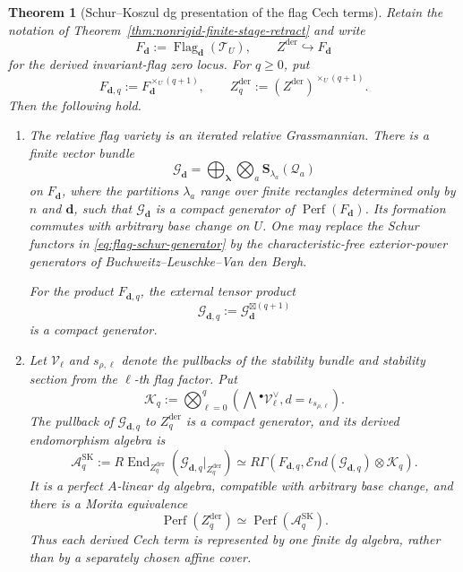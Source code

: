 \documentclass[11pt]{article}
\newtheorem{theorem}{Theorem}[section]
\theoremstyle{definition}
\begin{document}
\begin{theorem}[Schur--Koszul dg presentation of the flag Cech terms]\label{thm:schur-koszul-flag-dg}
Retain the notation of Theorem~\ref{thm:nonrigid-finite-stage-retract} and
write
\[
 F_{\mathbf d}:=\operatorname{Flag}_{\mathbf d}(\mathcal T_U),
 \qquad
 Z^{\mathrm{der}}\hookrightarrow F_{\mathbf d}
\]
for the derived invariant-flag zero locus.  For $q\ge0$, put
\[
 F_{\mathbf d,q}:=F_{\mathbf d}^{\times_U(q+1)},
 \qquad
 Z_q^{\mathrm{der}}:=(Z^{\mathrm{der}})^{\times_U(q+1)}.
\]
Then the following hold.

\begin{enumerate}[label=\textnormal{(\roman*)}]
\item The relative flag variety is an iterated relative Grassmannian.  There
is a finite vector bundle
\begin{equation}\label{eq:flag-schur-generator}
 \mathcal G_{\mathbf d}
 =\bigoplus_{\boldsymbol\lambda}
 \bigotimes_a
 \mathbf S_{\lambda_a}(\mathcal Q_a)
\end{equation}
on $F_{\mathbf d}$, where the partitions $\lambda_a$ range over finite
rectangles determined only by $n$ and $\mathbf d$, such that
$\mathcal G_{\mathbf d}$ is a compact generator of
$\operatorname{Perf}(F_{\mathbf d})$.  Its formation commutes with arbitrary
base change on $U$.  One may replace the Schur functors in
\eqref{eq:flag-schur-generator} by the characteristic-free exterior-power
generators of Buchweitz--Leuschke--Van den Bergh.

For the product $F_{\mathbf d,q}$, the external tensor product
\[
 \mathcal G_{\mathbf d,q}
 :=\mathcal G_{\mathbf d}^{\boxtimes(q+1)}
\]
is a compact generator.

\item Let $\mathcal V_\ell$ and $s_{\rho,\ell}$ denote the pullbacks of the
stability bundle and stability section from the $\ell$-th flag factor.  Put
\begin{equation}\label{eq:schur-koszul-flag-complex}
 \mathcal K_q
 :=\bigotimes_{\ell=0}^{q}
 \left(\bigwedge{}^\bullet\mathcal V_\ell^\vee,
 d=\iota_{s_{\rho,\ell}}\right).
\end{equation}
The pullback of $\mathcal G_{\mathbf d,q}$ to $Z_q^{\mathrm{der}}$ is a
compact generator, and its derived endomorphism algebra is
\begin{equation}\label{eq:schur-koszul-endomorphism-dga}
 \mathcal A_q^{\mathrm{SK}}
 :=R\operatorname{End}_{Z_q^{\mathrm{der}}}
 \left(\mathcal G_{\mathbf d,q}|_{Z_q^{\mathrm{der}}}\right)
 \simeq
 R\Gamma\!\left(
 F_{\mathbf d,q},
 \mathcal End(\mathcal G_{\mathbf d,q})\otimes\mathcal K_q
 \right).
\end{equation}
It is a perfect $A$-linear dg algebra, compatible with arbitrary base change,
and there is a Morita equivalence
\begin{equation}\label{eq:schur-koszul-morita-equivalence}
 \operatorname{Perf}(Z_q^{\mathrm{der}})
 \simeq
 \operatorname{Perf}(\mathcal A_q^{\mathrm{SK}}).
\end{equation}
Thus each derived Cech term is represented by one finite dg algebra, rather
than by a separately chosen affine cover.


\end{enumerate}
\end{theorem}
\end{document}
